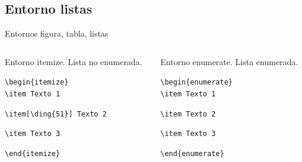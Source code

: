 \documentclass[aspectratio=169, 10pt]{beamer}
\begin{document}
\subsection{Entorno listas}
\begin{frame}[fragile]{Entornos figura, tabla, listas}

\vspace{5.5mm}
\begin{columns}

    \begin{column}{.48\linewidth}
    \begin{exampleblock}{Entorno itemize. Lista no enumerada.}
        
    
        \verb|\begin{itemize}|
        \\    
         \hspace{4mm}   \verb|\item Texto 1|
            
         \hspace{4mm}    \verb|\item[\ding{51}] Texto 2|
            
        \hspace{4mm}     \verb|\item Texto 3|
        
        \verb|\end{itemize}|  
    \end{exampleblock}
    \end{column} 
\pause
    \begin{column}{.48\linewidth}
    \begin{exampleblock}{Entorno enumerate. Lista enumerada.}
        
        \verb|\begin{enumerate}|
        \\
        \hspace{4mm}     \verb|\item Texto 1|
            
        \hspace{4mm}     \verb|\item Texto 2|
            
        \hspace{4mm}     \verb|\item Texto 3|
            
        \verb|\end{enumerate}|
    \end{exampleblock}



\end{column}
\end{columns}
\end{frame}
\end{document}
